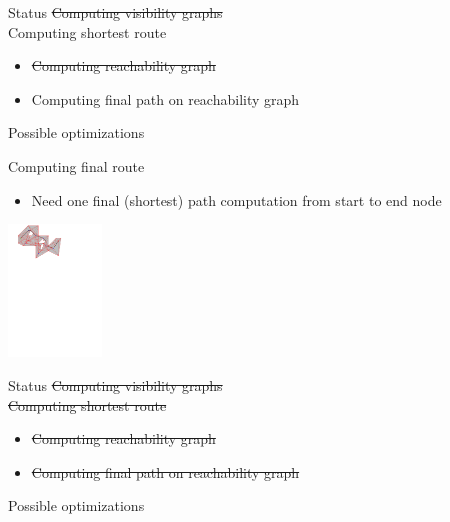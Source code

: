 \begin{frame}{Status}
\sout{Computing visibility graphs}
\\[2em]
Computing shortest route
\begin{itemize}
    \item \sout{Computing reachability graph}
    \item Computing final path on reachability graph
\end{itemize}
\vspace{2em}
Possible optimizations
\end{frame}

\begin{frame}[t]{Computing final route}

\begin{itemize}
    \item Need one final (shortest) path computation from start to end node
\end{itemize}

\begin{center}
\includegraphics[page=1,height=100pt]{graphics/final.pdf}%
\end{center}

\end{frame}

\begin{frame}{Status}
\sout{Computing visibility graphs}
\\[2em]
\sout{Computing shortest route}
\begin{itemize}
    \item \sout{Computing reachability graph}
    \item \sout{Computing final path on reachability graph}
\end{itemize}
\vspace{2em}
Possible optimizations
\end{frame}

